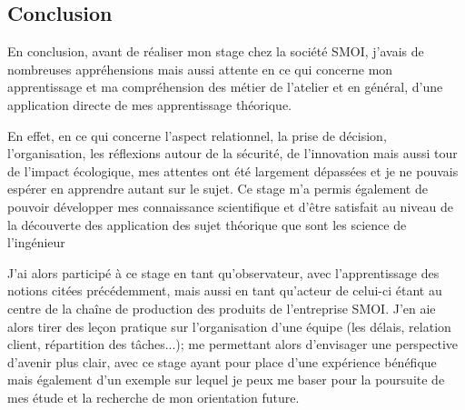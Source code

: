 \newpage
{}

\setcounter{secnumdepth}{0}
\begin{center}
    \section{Conclusion}
\end{center}
En conclusion, avant de réaliser mon stage chez la société SMOI, j'avais de nombreuses appréhensions mais aussi attente en ce qui concerne mon apprentissage et ma compréhension des métier de l'atelier et en général, d'une application directe de mes apprentissage théorique.\par
En effet, en ce qui concerne l'aspect relationnel, la prise de décision, l'organisation, les réflexions autour de la sécurité, de l'innovation mais aussi tour de l'impact écologique, mes attentes ont été largement dépassées et je ne pouvais espérer en apprendre autant sur le sujet. Ce stage m'a permis également de pouvoir développer mes connaissance scientifique et d'être satisfait au niveau de la découverte des application des sujet théorique que sont les science de l'ingénieur\newline

J'ai alors participé à ce stage en tant qu'observateur, avec l'apprentissage des notions citées précédemment, mais aussi en tant qu'acteur de celui-ci étant au centre de la chaîne de production des produits de l'entreprise SMOI. J'en aie alors tirer des leçon pratique sur l'organisation d'une équipe (les délais, relation client, répartition des tâches...); me permettant alors d'envisager une perspective d'avenir plus clair, avec ce stage ayant pour place d'une expérience bénéfique mais également d'un exemple sur lequel je peux me baser pour la poursuite de mes étude et la recherche de mon orientation future.
